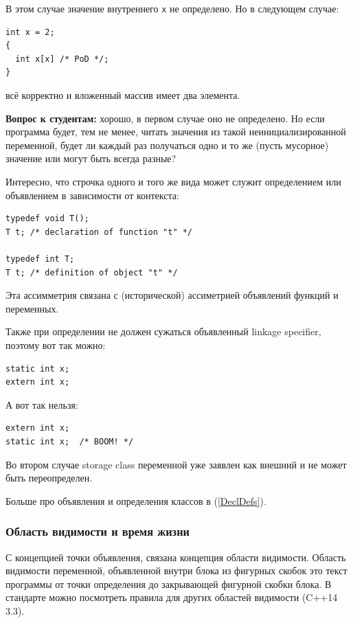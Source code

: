 \documentclass[a4paper,12pt,oneside]{article}
\newif\ifanswers
\begin{document}
В этом случае значение внутреннего \lstinline!x! не определено. Но в следующем случае:

\begin{lstlisting}
int x = 2;
{
  int x[x] /* PoD */;
}
\end{lstlisting}

всё корректно и вложенный массив имеет два элемента.

\textbf{Вопрос к студентам:} хорошо, в первом случае оно не определено. Но если программа будет, тем не менее, читать значения из такой неинициализированной переменной, будет ли каждый раз получаться одно и то же (пусть мусорное) значение или могут быть всегда разные?

\ifanswers
Ответ: могут быть всегда разные, так как UB
\fi

Интересно, что строчка одного и того же вида может служит определением или объявлением в зависимости от контекста:

\begin{lstlisting}
typedef void T();
T t; /* declaration of function "t" */

typedef int T;
T t; /* definition of object "t" */
\end{lstlisting}

Эта ассимметрия связана с (исторической) ассиметрией объявлений функций и переменных.

Также при определении не должен сужаться объявленный linkage specifier, поэтому вот так можно:

\begin{lstlisting}
static int x;
extern int x;
\end{lstlisting}

А вот так нельзя:

\begin{lstlisting}
extern int x;
static int x;  /* BOOM! */
\end{lstlisting}

Во втором случае storage class переменной уже заявлен как внешний и не может быть переопределен.

Больше про объявления и определения классов в (\ref{DeclDefs}).

\subsubsection{Область видимости и время жизни}\label{ScopeLifeTime}

С концепцией точки объявления, связана концепция области видимости. Область видимости  переменной, объявленной внутри блока из фигурных скобок это текст программы от точки определения до закрывающей фигурной скобки блока. В стандарте можно посмотреть правила для других областей видимости (C++14 3.3).
\end{document}
